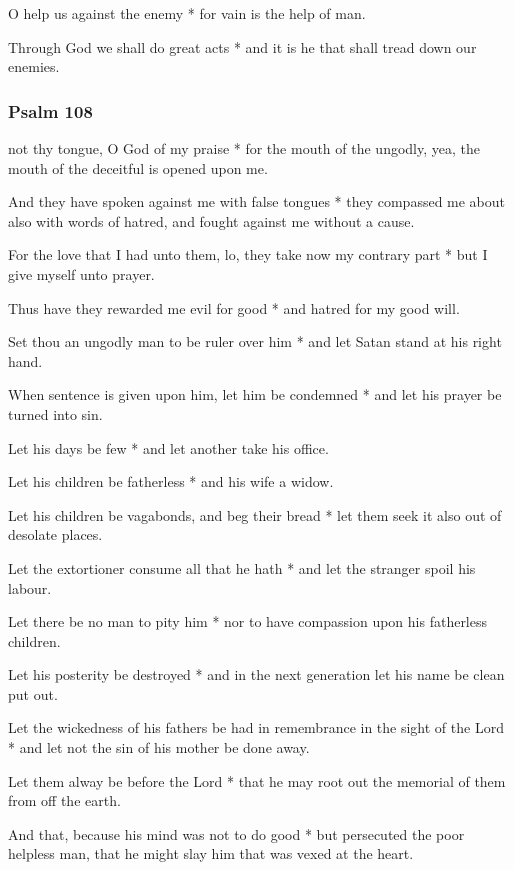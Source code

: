 O help us against the enemy * for vain is the help of man.

Through God we shall do great acts * and it is he that shall tread down our enemies.

\subsubsection{Psalm 108}


 not thy tongue, O God of my praise * for the mouth of the ungodly, yea, the mouth of the deceitful is opened upon me.

And they have spoken against me with false tongues * they compassed me about also with words of hatred, and fought against me without a cause.

For the love that I had unto them, lo, they take now my contrary part * but I give myself unto prayer.

Thus have they rewarded me evil for good * and hatred for my good will.

Set thou an ungodly man to be ruler over him * and let Satan stand at his right hand.

When sentence is given upon him, let him be condemned * and let his prayer be turned into sin.

Let his days be few * and let another take his office.

Let his children be fatherless * and his wife a widow.

Let his children be vagabonds, and beg their bread * let them seek it also out of desolate places.

Let the extortioner consume all that he hath * and let the stranger spoil his labour.

Let there be no man to pity him * nor to have compassion upon his fatherless children.

Let his posterity be destroyed * and in the next generation let his name be clean put out.

Let the wickedness of his fathers be had in remembrance in the sight of the Lord * and let not the sin of his mother be done away.

Let them alway be before the Lord * that he may root out the memorial of them from off the earth.

And that, because his mind was not to do good * but persecuted the poor helpless man, that he might slay him that was vexed at the heart.

